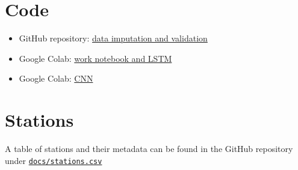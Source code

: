 \documentclass{article}
\begin{document}
\appendix
\section{Code}
\begin{itemize}
\item GitHub repository: \href{https://github.com/theplatters/ecmi-hydrological-forecasting}{data imputation and validation}
\item Google Colab: \href{https://colab.research.google.com/drive/1ZobMWBW76xJHmeTsbXmjmgCzcv5sGrSV?usp=sharing}{work
notebook and LSTM}
\item Google Colab: \href{https://colab.research.google.com/drive/1TM0TM2p8cphnl7WuYu9bTIFMF2lW8gyv?usp=sharing}{CNN}
\end{itemize}

\section{Stations}
A table of stations and their metadata can be found in the GitHub repository under \href{https://github.com/theplatters/ecmi-hydrological-forecasting/blob/main/doc/stations.csv}{\texttt{docs/stations.csv}}
\end{document}
